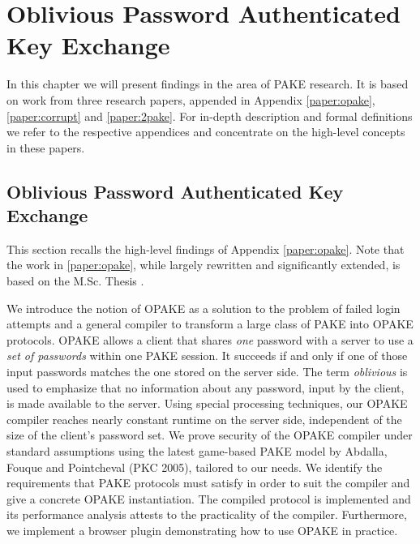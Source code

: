 \chapter{Oblivious Password Authenticated Key Exchange}\label{ch:opake}
In this chapter we will present findings in the area of \ac{PAKE} research.
It is based on work from three research papers, appended in Appendix \ref{paper:opake}, \ref{paper:corrupt} and \ref{paper:2pake}.
For in-depth description and formal definitions we refer to the respective appendices and concentrate on the high-level concepts in these papers.

\section{Oblivious Password Authenticated Key Exchange} \label{sec:opake}
This section recalls the high-level findings of Appendix \ref{paper:opake}.
Note that the work in \ref{paper:opake}, while largely rewritten and significantly extended, is based on the M.Sc. Thesis \cite{Kiefer2012}.

We introduce the notion of \acl{OPAKE} as a solution to the problem of failed login attempts and a general compiler to transform a large class of \ac{PAKE} into \ac{OPAKE} protocols.
\ac{OPAKE} allows a client that shares \emph{one} password with a server to use a \emph{set of passwords} within one \ac{PAKE} session.
It succeeds if and only if one of those input passwords matches the one stored on the server side. The term \emph{oblivious} is used to emphasize that no information about any password, input by the client, is made available to the server.
Using special processing techniques, our \ac{OPAKE} compiler reaches nearly constant runtime on the server side, independent of the size of the client's password set.
We prove security of the \ac{OPAKE} compiler under standard assumptions using the latest game-based \ac{PAKE} model by Abdalla, Fouque and Pointcheval (PKC 2005), tailored to our needs.
We identify the requirements that \ac{PAKE} protocols must satisfy in order to suit the compiler and give a concrete \ac{OPAKE} instantiation.
The compiled protocol is implemented and its performance analysis attests to the practicality of the compiler.
Furthermore, we implement a browser plugin demonstrating how to use \ac{OPAKE} in practice.

